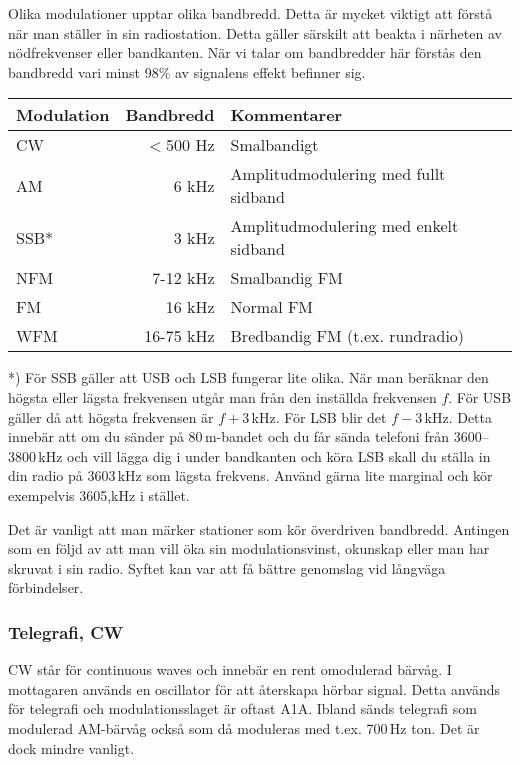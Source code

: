 Olika modulationer upptar olika bandbredd. Detta är mycket viktigt att förstå när man ställer in sin radiostation. Detta gäller särskilt att beakta i närheten av nödfrekvenser eller bandkanten. När vi talar om bandbredder här förstås den bandbredd vari minst 98\% av signalens effekt befinner sig.

\begin{tabular}{lrl}
	\textbf{Modulation} & \textbf{Bandbredd} & \textbf{Kommentarer}                  \\ \hline
	CW                  &          $<$500 Hz & Smalbandigt                           \\
	AM                  &              6 kHz & Amplitudmodulering med fullt sidband  \\
	SSB*                &              3 kHz & Amplitudmodulering med enkelt sidband \\
	NFM                 &           7-12 kHz & Smalbandig FM                         \\
	FM                  &             16 kHz & Normal FM                             \\
	WFM                 &          16-75 kHz & Bredbandig FM (t.ex. rundradio)
\end{tabular}

*) För SSB gäller att USB och LSB fungerar lite olika. När man beräknar den högsta eller lägsta frekvensen utgår man från den inställda frekvensen $f$. För USB gäller då att högsta frekvensen är $f+3$\,kHz. För LSB blir det $f-3$\,kHz. Detta innebär att om du sänder på 80\,m-bandet och du får sända telefoni från 3600--3800\,kHz och vill lägga dig i under bandkanten och köra LSB skall du ställa in din radio på 3603\,kHz som lägsta frekvens. Använd gärna lite marginal och kör exempelvis 3605,kHz i stället.

Det är vanligt att man märker stationer som kör överdriven bandbredd. Antingen som en följd av att man vill öka sin modulationsvinst, okunskap eller man har skruvat i sin radio. Syftet kan var att få bättre genomslag vid långväga förbindelser.

\subsubsection{Telegrafi, CW}

CW står för continuous waves och innebär en rent omodulerad bärvåg. I mottagaren används en oscillator för att återskapa hörbar signal. Detta används för telegrafi och modulationsslaget är oftast A1A. Ibland sänds telegrafi som modulerad AM-bärvåg också som då moduleras med t.ex. 700\,Hz ton. Det är dock mindre vanligt.

